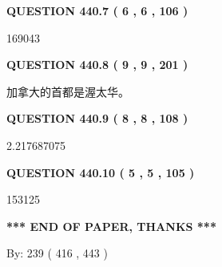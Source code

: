 \documentclass{ctexart}
\begin{document}
 
  
\vspace{0.2in}
  
{\textbf{\Large{QUESTION
440.7 
 ( 6 , 6 , 106 )
}}}
  
  
 
 
\noindent{}

169043
 
 
  
\vspace{0.2in}
  
{\textbf{\Large{QUESTION
440.8 
 ( 9 , 9 , 201 )
}}}
  
  
 
 
\noindent{}
 
 
加拿大的首都是渥太华。
 
 
 
 
  
\vspace{0.2in}
  
{\textbf{\Large{QUESTION
440.9 
 ( 8 , 8 , 108 )
}}}
  
  
 
 
\noindent{}

2.217687075
 
 
  
\vspace{0.2in}
  
{\textbf{\Large{QUESTION
440.10 
 ( 5 , 5 , 105 )
}}}
  
  
 
 
\noindent{}

153125
 
 
   
   
 \vspace{0.2in}
 
   
   
   
   
\vspace{1.0in} 
{\textbf{\large{ *** END OF PAPER, THANKS *** }}} 
   
   
\hspace{1.0in} By: 
 239 ( 416 ,  443 )
   
   
   
   
\newpage 
\setcounter{page}{ 
   441001 } 
   
\end{document}
